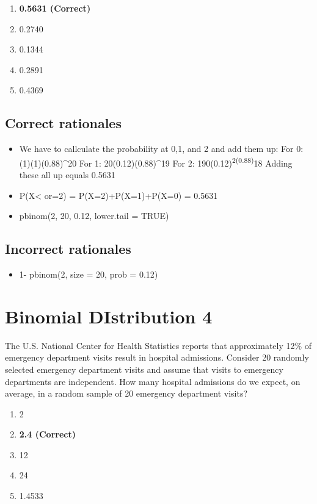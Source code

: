 \documentclass[letterpaper,9pt,twoside,printwatermark=false]{pinp}
\providecommand{\tightlist}{%
  \setlength{\itemsep}{0pt}\setlength{\parskip}{0pt}}
\begin{document}
\begin{enumerate}
\def\labelenumi{\alph{enumi}.}
\tightlist
\item
  \textbf{0.5631 (Correct)}
\item
  0.2740
\item
  0.1344
\item
  0.2891
\item
  0.4369
\end{enumerate}

\subsection{Correct rationales}\label{correct-rationales-2}

\begin{itemize}
\tightlist
\item
  We have to callculate the probability at 0,1, and 2 and add them up:
  For 0: (1)(1)(0.88)\^{}20 For 1: 20(0.12)(0.88)\^{}19 For 2:
  190(0.12)\textsuperscript{2(0.88)}18 Adding these all up equals 0.5631
\item
  P(X\textless{} or=2) = P(X=2)+P(X=1)+P(X=0) = 0.5631
\item
  pbinom(2, 20, 0.12, lower.tail = TRUE)
\end{itemize}

\subsection{Incorrect rationales}\label{incorrect-rationales-2}

\begin{itemize}
\tightlist
\item
  1- pbinom(2, size = 20, prob = 0.12)
\end{itemize}

\section{Binomial DIstribution 4}\label{binomial-distribution-4}

The U.S. National Center for Health Statistics reports that
approximately 12\% of emergency department visits result in hospital
admissions. Consider 20 randomly selected emergency department visits
and assume that visits to emergency departments are independent. How
many hospital admissions do we expect, on average, in a random sample of
20 emergency department visits?

\begin{enumerate}
\def\labelenumi{\alph{enumi}.}
\tightlist
\item
  2
\item
  \textbf{2.4 (Correct)}
\item
  12
\item
  24
\item
  1.4533
\end{enumerate}
\end{document}
